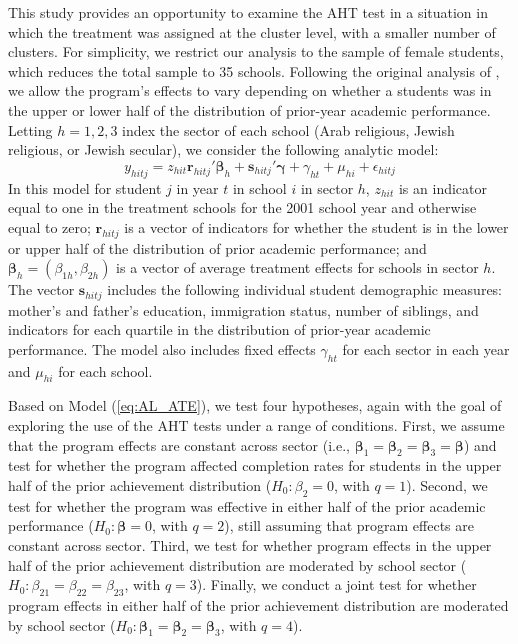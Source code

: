 \documentclass[12pt]{article}\usepackage[]{graphicx}\usepackage[]{color}
\newcommand{\bm}{\mathbf}
\newcommand{\bs}{\boldsymbol}
\begin{document}
This study provides an opportunity to examine the AHT test in a situation in which the treatment was assigned at the cluster level, with a smaller number of clusters.
For simplicity, we restrict our analysis to the sample of female students, which reduces the total sample to 35 schools.
Following the original analysis of \citet{Angrist2009effects}, we allow the program's effects to vary depending on whether a students was in the upper or lower half of the distribution of prior-year academic performance. 
Letting $h = 1,2,3$ index the sector of each school (Arab religious, Jewish religious, or Jewish secular), we consider the following analytic model: 
\begin{equation}
\label{eq:AL_ATE}
y_{hitj} = z_{hit}\bm{r}_{hitj}'\bs\beta_h + \bm{s}_{hitj}'\bs\gamma + \gamma_{ht} + \mu_{hi} + \epsilon_{hitj}
\end{equation}
In this model for student $j$ in year $t$ in school $i$ in sector $h$, $z_{hit}$ is an indicator equal to one in the treatment schools for the 2001 school year and otherwise equal to zero; $\bm{r}_{hitj}$ is a vector of indicators for whether the student is in the lower or upper half of the distribution of prior academic performance; and $\bs\beta_h = \left(\beta_{1h}, \beta_{2h}\right)$ is a vector of average treatment effects for schools in sector $h$. 
The vector $\bm{s}_{hitj}$ includes the following individual student demographic measures: mother's and father's education, immigration status, number of siblings, and indicators for each quartile in the distribution of prior-year academic performance. 
The model also includes fixed effects $\gamma_{ht}$ for each sector in each year and $\mu_{hi}$ for each school. 

Based on Model (\ref{eq:AL_ATE}), we test four hypotheses, again with the goal of exploring the use of the AHT tests under a range of conditions. 
First, we assume that the program effects are constant across sector (i.e., $\bs\beta_1 = \bs\beta_2 = \bs\beta_3 = \bs\beta$) and test for whether the program affected completion rates for students in the upper half of the prior achievement distribution ($H_0: \beta_2 = 0$, with $q = 1$).
Second, we test for whether the program was effective in either half of the prior academic performance ($H_0: \bs\beta = 0$, with $q = 2$), still assuming that program effects are constant across sector. 
Third, we test for whether program effects in the upper half of the prior achievement distribution are moderated by school sector ($H_0: \beta_{21} = \beta_{22} = \beta_{23}$, with $q = 3$). 
Finally, we conduct a joint test for whether program effects in either half of the prior achievement distribution are moderated by school sector ($H_0: \bs\beta_1 = \bs\beta_2 = \bs\beta_3$, with $q = 4$). 
\end{document}
